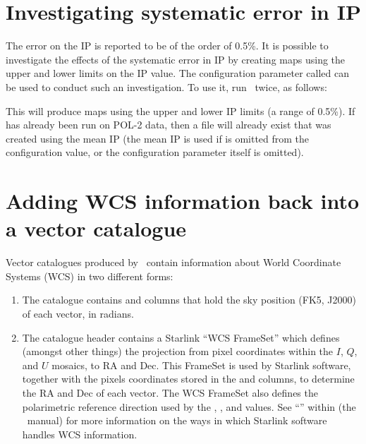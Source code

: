 \section{Investigating systematic error in IP}


The error on the IP is reported to be of the order of 0.5\%.  It is
possible to investigate the effects of the systematic error in IP by
creating maps using the upper and lower limits on the IP value. The
 configuration parameter called 
can be used to conduct such an investigation. To use it, run \poltwomap\ twice,
as follows:

\begin{terminalv}
\end{terminalv}

This will produce maps using the upper and lower IP limits (a range of
0.5\%). If  has already been run on POL-2 data, then a file will
already exist that was created using the mean IP (the mean IP is used
if  is omitted from the configuration value, or the
configuration parameter itself is omitted).



\section{\label{sec:wcscopy}Adding WCS information back into a vector catalogue}
Vector catalogues produced by \poltwomap\ contain information about World Coordinate
Systems (WCS) in two different forms:

\begin{enumerate}
\item The catalogue contains  and  columns that hold the sky position
(FK5, J2000) of each vector, in radians.
\item The catalogue header contains a Starlink ``WCS FrameSet'' which defines
(amongst other things) the projection from pixel coordinates within
the $I$, $Q$, and $U$ mosaics, to RA and Dec. This FrameSet is used by Starlink software, together
with the pixels coordinates stored in the  and  columns, to determine
the RA and Dec of each vector. The WCS FrameSet also defines the polarimetric
reference direction used by the , , and  values. See
``''
within  (the \KAPPA\ manual) for more information on
the ways in which Starlink software handles WCS information.
\end{enumerate}

